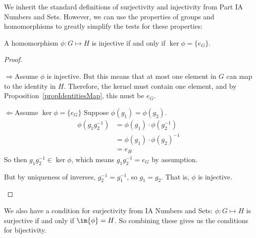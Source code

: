 \documentclass[../Main.tex]{subfiles}
\begin{document}
We inherit the standard definitions of surjectivity and injectivity from Part IA Numbers and Sets. However, we can use the properties of groups and homomorphisms to greatly simplify the tests for these properties:
\begin{proposition}
    A homomorphism $\phi : G \mapsto H$ is injective if and only if $\ker{\phi} = \{e_G\}$.
    \label{propInjectivityTrivialKer}
\end{proposition}
\begin{proof}
    \begin{proofdirection}{$\Rightarrow$}{Assume $\phi$ is injective.}
        But this means that at most one element in $G$ can map to the identity in $H$. Therefore, the kernel must contain one element, and by Proposition~\ref{propIdentitiesMap}, this must be $e_G$.
    \end{proofdirection}
    \begin{proofdirection}{$\Leftarrow$}{Assume $\ker{\phi} = \{e_G\}$}
        Suppose $\phi(g_1) = \phi(g_2)$.
        \begin{align*}
            \phi(g_1 g_2^{-1}) &= \phi(g_1) \cdot \phi(g_2^{-1}) \\ 
            &= \phi(g_1) \cdot \phi(g_2)^{-1} \\
            &= e_H
        \end{align*}
        So then $g_1 g_2^{-1} \in \ker{\phi}$, which means $g_1 g_2^{-1} = e_G$ by assumption.\par
        But by uniqueness of inverses, $g_2^{-1} = g_1^{-1}$, so $g_1 = g_2$. That is, $\phi$ is injective.
    \end{proofdirection}
\end{proof}
We also have a condition for surjectivity from IA Numbers and Sets: $\phi : G \mapsto H$ is surjective if and only if $\im{\phi} = H$. So combining these gives us the conditions for bijectivity.
\end{document}
